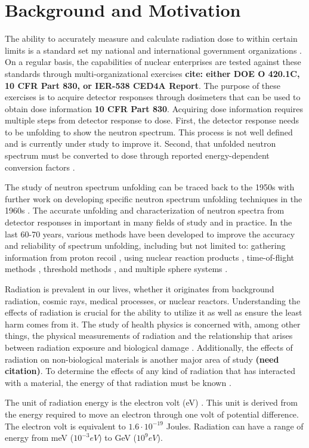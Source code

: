 \section{Background and Motivation}\label{background}
The ability to accurately measure and calculate radiation dose to within certain limits is a standard set my national and international government organizations \cite{doe-std-1098}. On a regular basis, the capabilities of nuclear enterprises are tested against these standards through multi-organizational exercises \textbf{cite: either DOE O 420.1C, 10 CFR Part 830, or IER-538 CED4A Report}. The purpose of these exercises is to acquire detector responses through dosimeters that can be used to obtain dose information \textbf{10 CFR Part 830}. Acquiring dose information requires multiple steps from detector response to dose. First, the detector response needs to be unfolding to show the neutron spectrum. This process is not well defined and is currently under study to improve it. Second, that unfolded neutron spectrum must be converted to dose through reported energy-dependent conversion factors \cite{compendium_of_neutron_spectra}.

The study of neutron spectrum unfolding can be traced back to the 1950s \cite{poole_1952} with further work on developing specific neutron spectrum unfolding techniques in the 1960s \cite{habiger_1966}. The accurate unfolding and characterization of neutron spectra from detector responses in important in many fields of study and in practice. In the last 60-70 years, various methods have been developed to improve the accuracy and reliability of spectrum unfolding, including but not limited to: gathering information from proton recoil \cite{wu_guung_pei_yang_hwang_thomas_1999}, using nuclear reaction products \cite{dietz_matzke_sosaat_urbach_weyrauch_1993}, time-of-flight methods \cite{colonna_tagliente_1998}, threshold methods \cite{kuijpers_herzing_cloth_filges_hecker_1977}, and multiple sphere systems \cite{bramblett_ewing_bonner_1960}.

Radiation is prevalent in our lives, whether it originates from background radiation, cosmic rays, medical processes, or nuclear reactors. Understanding the effects of radiation is crucial for the ability to utilize it as well as ensure the least harm comes from it. The study of health physics is concerned with, among other things, the physical measurements of radiation and the relationship that arises between radiation exposure and biological damage \cite{johnson_cember_2017}. Additionally, the effects of radiation on non-biological materials is another major area of study \textbf{(need citation)}. To determine the effects of any kind of radiation that has interacted with a material, the energy of that radiation must be known \cite{johnson_cember_2017}. 

The unit of radiation energy is the electron volt (eV) \cite{johnson_cember_2017}. This unit is derived from the energy required to move an electron through one volt of potential difference. The electron volt is equivalent to $1.6 \cdot 10^{-19}$ Joules. Radiation can have a range of energy from meV ($10^{-3} eV$) to GeV ($10^9 eV$).
